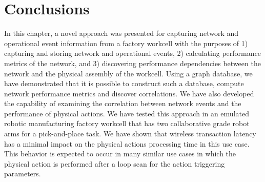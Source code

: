 \section{Conclusions} \label{gdbappl:sec::conclusion}
In this chapter, a novel approach was presented for capturing network and operational event information from a factory workcell with the  purposes of 1) capturing and storing network and operational events, 2) calculating performance metrics of the network, and 3) discovering performance dependencies between the network and the physical assembly of the workcell. Using a graph database, we have demonstrated that it is possible to construct such a database, compute network performance metrics and discover correlations. We have also developed the capability of examining the correlation between network events and the performance of physical actions. We have tested this approach in an emulated robotic manufacturing factory workcell that has two collaborative grade robot arms for a pick-and-place task. We have shown that wireless transaction latency has a minimal impact on the physical actions processing time in this use case. This behavior is expected to occur in many similar use cases in which the physical action is performed after a loop scan for the action triggering parameters. 


